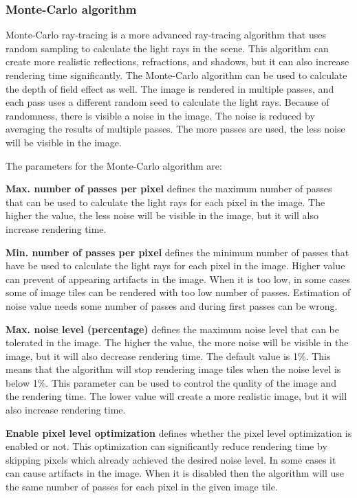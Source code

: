 \subsubsection{Monte-Carlo algorithm}\label{effects-ray-tracing-monte-carlo}
Monte-Carlo ray-tracing is a more advanced ray-tracing algorithm that uses random sampling to calculate the light rays in the scene. This algorithm can create more realistic reflections, refractions, and shadows, but it can also increase rendering time significantly. The Monte-Carlo algorithm can be used to calculate the depth of field effect as well. The image is rendered in multiple passes, and each pass uses a different random seed to calculate the light rays. Because of randomness, there is visible a noise in the image. The noise is reduced by averaging the results of multiple passes. The more passes are used, the less noise will be visible in the image. 

The parameters for the Monte-Carlo algorithm are:

\textbf{Max. number of passes per pixel} defines the maximum number of passes that can be used to calculate the light rays for each pixel in the image. The higher the value, the less noise will be visible in the image, but it will also increase rendering time.

\textbf{Min. number of passes per pixel} defines the minimum number of passes that have be used to calculate the light rays for each pixel in the image. Higher value can prevent of appearing artifacts in the image. When it is too low, in some cases some of image tiles can be rendered with too low number of passes. Estimation of noise value needs some number of passes and during first passes can be wrong.

\textbf{Max. noise level (percentage)} defines the maximum noise level that can be tolerated in the image. The higher the value, the more noise will be visible in the image, but it will also decrease rendering time. The default value is 1\%. This means that the algorithm will stop rendering image tiles when the noise level is below 1\%. This parameter can be used to control the quality of the image and the rendering time. The lower value will create a more realistic image, but it will also increase rendering time.

\textbf{Enable pixel level optimization} defines whether the pixel level optimization is enabled or not. This optimization can significantly reduce rendering time by skipping pixels which already achieved the desired noise level. In some cases it can cause artifacts in the image. When it is disabled then the algorithm will use the same number of passes for each pixel in the given image tile.

